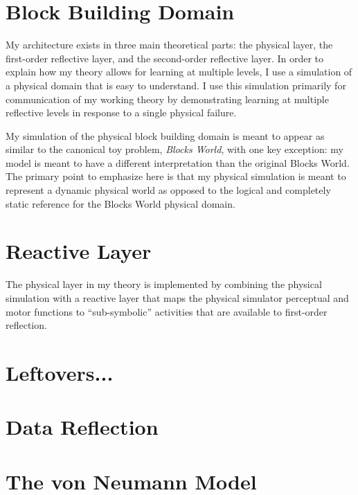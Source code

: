 \section{Block Building Domain}

My architecture exists in three main theoretical parts: the physical
layer, the first-order reflective layer, and the second-order
reflective layer.  In order to explain how my theory allows for
learning at multiple levels, I use a simulation of a physical domain
that is easy to understand.  I use this simulation primarily for
communication of my working theory by demonstrating learning at
multiple reflective levels in response to a single physical failure.

My simulation of the physical block building domain is meant to appear
as similar to the canonical toy problem, \emph{Blocks World}, with one
key exception: my model is meant to have a different interpretation
than the original Blocks World.  The primary point to emphasize here
is that my physical simulation is meant to represent a dynamic
physical world as opposed to the logical and completely static
reference for the Blocks World physical domain.



\section{Reactive Layer}

The physical layer in my theory is implemented by combining the
physical simulation with a reactive layer that maps the physical
simulator perceptual and motor functions to ``sub-symbolic''
activities that are available to first-order reflection.



\section{Leftovers...}

\section{Data Reflection}



\section{The von Neumann Model}

